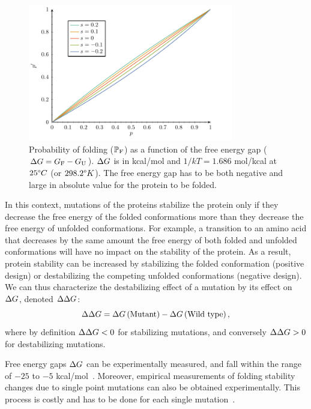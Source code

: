 \begin{figure}[H]
    \centering
    \includegraphics[width=0.8\textwidth, page=5] {figures.pdf}
    \caption[Probability of folding]{
    Probability of folding ($\mathbb{P}_{\text{F}}$) as a function of the free energy gap ($\Delta G = G_{\text{F}} - G_{\text{U}}$).
    $\Delta G$ is in kcal/mol and $1/kT=1.686$ mol/kcal at $25 \degree C$ (or $298.2 \degree K$).
    The free energy gap has to be both negative and large in absolute value for the protein to be folded.
    }
    \label{fig:intro-proba-folding}
\end{figure}

In this context, mutations of the proteins stabilize the protein only if they decrease the free energy of the folded conformations more than they decrease the free energy of unfolded conformations.
For example, a transition to an amino acid that decreases by the same amount the free energy of both folded and unfolded conformations will have no impact on the stability of the protein.
As a result, protein stability can be increased by stabilizing the folded conformation (positive design) or destabilizing the competing unfolded conformations (negative design).
We can thus characterize the destabilizing effect of a mutation by its effect on $\Delta G$, denoted $\Delta \Delta G$:
\begin{equation}
    \Delta \Delta G = \Delta G \left( \text{Mutant} \right) - \Delta G  \left( \text{Wild type} \right),
\end{equation}
where by definition $\Delta \Delta G <0 $ for stabilizing mutations, and conversely $\Delta \Delta G > 0 $ for destabilizing mutations.

Free energy gaps $\Delta G$ can be experimentally measured, and fall within the range of $-25$ to $-5$ kcal/mol~\citep{Kumar2006, Gromiha2016}.
Moreover, empirical measurements of folding stability changes due to single point mutations can also be obtained experimentally. This process is costly and has to be done for each single mutation~\citep{Rocklin2017}.

